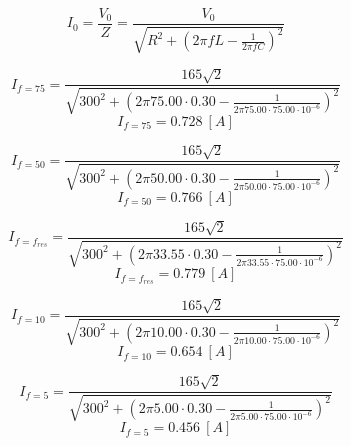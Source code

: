 \documentclass[journal]{IEEEtran}
\begin{document}
\begin{equation}
I_0 = \frac{V_0}{Z} = \frac{V_0}{\sqrt{R^2 + (2\pi f L - \frac{1}{2\pi f C})^2}}
\end{equation}

\begin{equation}
I_{f=75} = \frac{165\sqrt{2}}{\sqrt{300^2 + (2\pi 75.00\cdot 0.30 - \frac{1}{2\pi 75.00\cdot 75.00\cdot 10^{-6}})^2}}
\end{equation}
\begin{equation}
I_{f=75} = 0.728~[A]
\end{equation}

\begin{equation}
I_{f=50} = \frac{165\sqrt{2}}{\sqrt{300^2 + (2\pi 50.00\cdot 0.30 - \frac{1}{2\pi 50.00\cdot 75.00\cdot 10^{-6}})^2}}
\end{equation}
\begin{equation}
I_{f=50} = 0.766~[A]
\end{equation}

\begin{equation}
I_{f=f_{res}} = \frac{165\sqrt{2}}{\sqrt{300^2 + (2\pi 33.55\cdot 0.30 - \frac{1}{2\pi 33.55\cdot 75.00\cdot 10^{-6}})^2}}
\end{equation}
\begin{equation}
I_{f=f_{res}} = 0.779~[A]
\end{equation}

\begin{equation}
I_{f=10} = \frac{165\sqrt{2}}{\sqrt{300^2 + (2\pi 10.00\cdot 0.30 - \frac{1}{2\pi 10.00\cdot 75.00\cdot 10^{-6}})^2}}
\end{equation}
\begin{equation}
I_{f=10} = 0.654~[A]
\end{equation}

\begin{equation}
I_{f=5} = \frac{165\sqrt{2}}{\sqrt{300^2 + (2\pi 5.00\cdot 0.30 - \frac{1}{2\pi 5.00\cdot 75.00\cdot 10^{-6}})^2}}
\end{equation}
\begin{equation}
I_{f=5} = 0.456~[A]
\end{equation}
\end{document}
